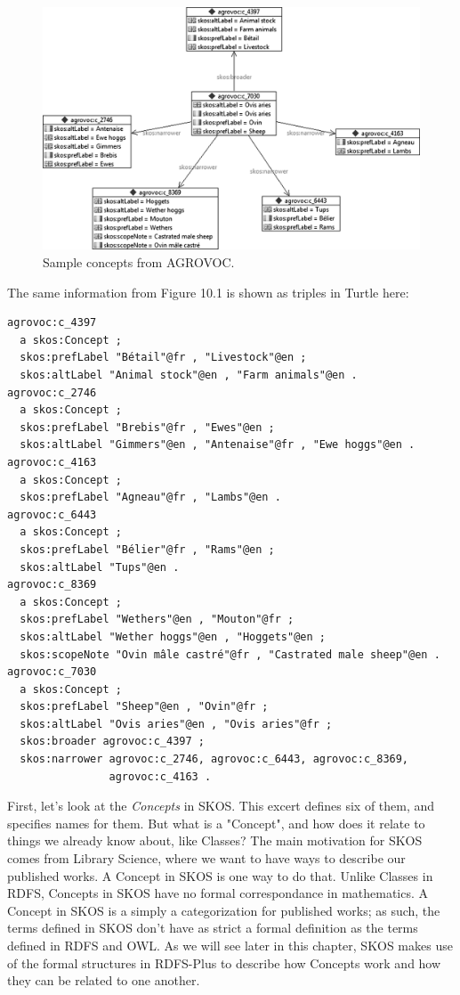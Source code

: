\begin{figure}
\centering
\includegraphics[width=5in]{media/ch11/f11-01.png}
\caption{Sample concepts from AGROVOC.}
\label{fig:ch11.1}
\end{figure}


The same information from Figure 10.1 is shown as triples in Turtle
here:

\begin{lstlisting}
agrovoc:c_4397
  a skos:Concept ;
  skos:prefLabel "Bétail"@fr , "Livestock"@en ;
  skos:altLabel "Animal stock"@en , "Farm animals"@en .
agrovoc:c_2746
  a skos:Concept ;
  skos:prefLabel "Brebis"@fr , "Ewes"@en ;
  skos:altLabel "Gimmers"@en , "Antenaise"@fr , "Ewe hoggs"@en .
agrovoc:c_4163
  a skos:Concept ;
  skos:prefLabel "Agneau"@fr , "Lambs"@en .
agrovoc:c_6443
  a skos:Concept ;
  skos:prefLabel "Bélier"@fr , "Rams"@en ;
  skos:altLabel "Tups"@en .
agrovoc:c_8369
  a skos:Concept ;
  skos:prefLabel "Wethers"@en , "Mouton"@fr ;
  skos:altLabel "Wether hoggs"@en , "Hoggets"@en ;
  skos:scopeNote "Ovin mâle castré"@fr , "Castrated male sheep"@en .
agrovoc:c_7030
  a skos:Concept ;
  skos:prefLabel "Sheep"@en , "Ovin"@fr ;
  skos:altLabel "Ovis aries"@en , "Ovis aries"@fr ;
  skos:broader agrovoc:c_4397 ;
  skos:narrower agrovoc:c_2746, agrovoc:c_6443, agrovoc:c_8369,
                agrovoc:c_4163 .
\end{lstlisting}

First, let's look at the \textit{Concepts} in SKOS. This excert defines six of them, and specifies
names for them.  But what is a "Concept", and how does it relate to things we already know about, 
like Classes?  The main motivation for SKOS comes from Library Science, where we want to have ways to describe our 
published works.  A Concept in SKOS is one way to do that.  Unlike Classes in RDFS, Concepts in SKOS have no formal correspondance in mathematics. A Concept in SKOS is a simply a categorization for published works; as such, the terms defined in SKOS don't have as strict a formal definition as the terms defined in RDFS and OWL.  As we will see later in this chapter, SKOS makes use of the formal structures in RDFS-Plus to describe how Concepts work and how they can be related to one another. 

